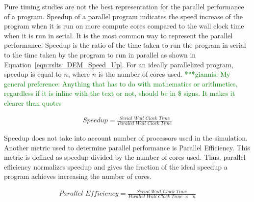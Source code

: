 \documentclass[preprint,11pt,authoryear]{elsarticle}
\newcommand{\gpnote}[1]{{\textcolor{green} {***giannis: #1}}}
\newcommand{\gpnote}[1]{}
\begin{document}
Pure timing studies are not the best representation for the parallel performance of a program. 
Speedup of a parallel program indicates the speed increase of the program when it is run on more 
compute cores compared to the wall clock time when it is run in serial. It is the most common way to 
represent the parallel performance. Speedup is the ratio of the time taken to run the program in serial 
to the time taken by the program to run in parallel as shown in Equation~\ref{eqn:rslts_DEM_Speed_Up}. 
For an ideally parallelized program, speedup is equal to $n$, where $n$ is the number of cores used.
\gpnote{My general preference: Anything that has to do with mathematics or arithmetics, regardless if it
    is inline with the text or not, should be in \$ signs. It makes it clearer than quotes}

\begin{align}
\textit{Speedup} = \frac{\textit{Serial Wall Clock Time}}{\textit{Parallel Wall Clock Time}}\label{eqn:rslts_DEM_Speed_Up}
\end{align}

Speedup does not take into account number of processors used in the simulation. Another metric 
used to determine parallel performance is Parallel Efficiency. This metric is defined as 
speedup divided by the number of cores used. Thus, parallel efficiency normalizes speedup and gives 
the fraction of the ideal speedup a program achieves increasing the number of cores.

\begin{align}
\textit{Parallel Efficiency} = \frac{\textit{Serial Wall Clock Time}}{\textit{Parallel Wall Clock Time $\times$ $n$}}
\label{eqn:rslts_DEM_parallel_efficiency}
\end{align}
\end{document}
